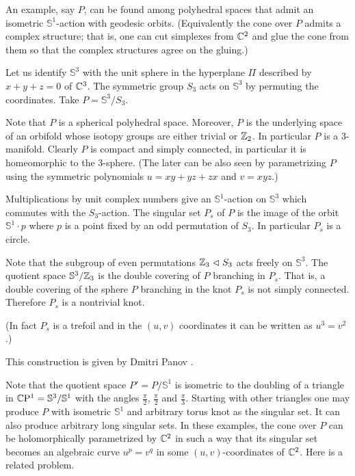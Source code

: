 An example, say $P$, can be found among polyhedral spaces that admit an isometric $\mathbb{S}^1$-action with geodesic orbits.
(Equivalently the cone over $P$ admits a complex structure; 
that is, one can cut simplexes from $\mathbb{C}^2$ and glue the cone from them so that the complex structures agree on the gluing.)

\medskip

Let us identify $\mathbb{S}^3$ with the unit sphere in the hyperplane $\Pi$ described by $x+y+z=0$ of $\mathbb{C}^3$.
The symmetric group $S_3$ acts on $\mathbb{S}^3$ by permuting the coordinates.
Take $P=\mathbb{S}^3/S_3$. 

Note that $P$ is a spherical polyhedral space.
Moreover, $P$ is the  underlying space of an orbifold whose isotopy groups are either trivial or $\mathbb{Z}_2$.
In particular $P$ is a 3-manifold.
Clearly $P$ is compact and simply connected, in particular it is homeomorphic to the 3-sphere.
(The later can be also seen by parametrizing $P$ using the symmetric polynomials $u=xy+yz+zx$ and $v=xyz$.)


Multiplications by unit complex numbers give an $\mathbb{S}^1$-action on $\mathbb{S}^3$ which commutes with the $S_3$-action.
The singular set $P_s$ of $P$ is the image of the orbit $\mathbb{S}^1\cdot p$ where $p$ is a point fixed by an odd permutation of $S_3$.
In particular $P_s$ is a circle.

Note that the subgroup of even permutations $\mathbb{Z}_3\vartriangleleft S_3$ acts freely on $\mathbb{S}^3$.
The quotient space $\mathbb{S}^3/\mathbb{Z}_3$ is the double covering of $P$ branching in $P_s$.
That is, a double covering of the sphere $P$ branching in the knot $P_s$ is not simply connected.
Therefore $P_s$ is a nontrivial knot.

(In fact $P_s$ is a trefoil and in the $(u,v)$ coordinates it can be written as $u^3=v^2$.)
\qeds


This construction is given by Dmitri Panov \cite{panov-Kaeler}.

Note that the quotient space $P'=P/\mathbb{S}^1$ is isometric to the doubling of a triangle in $\mathbb{C}\mathrm{P}^1=\mathbb{S}^3/\mathbb{S}^1$ with the angles $\tfrac\pi2$, $\tfrac\pi2$ and $\tfrac\pi3$.
Starting with other triangles one may produce $P$ with isometric $\mathbb{S}^1$ and arbitrary torus knot as the singular set.
It can also produce arbitrary long singular sets.
In these examples, the cone over $P$ can be holomorphically parametrized by $\mathbb{C}^2$ in such a way that its singular set becomes an algebraic curve $u^p=v^q$ in some $(u,v)$-coordinates of $\mathbb{C}^2$.
Here is a related problem.

